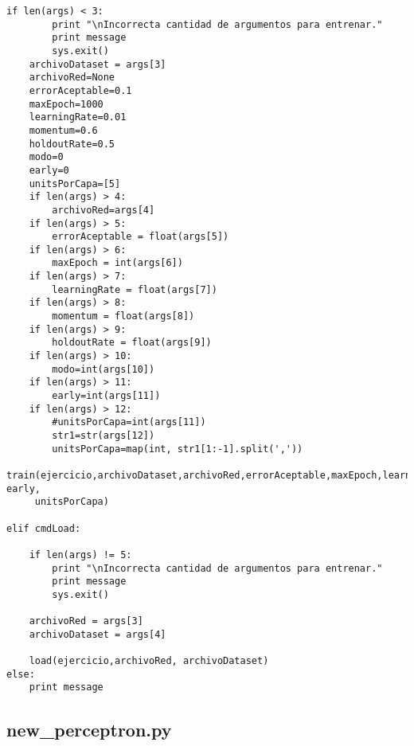 \begin{lstlisting}[caption=main.py]
	if len(args) < 3:
		print "\nIncorrecta cantidad de argumentos para entrenar."
		print message
		sys.exit()
	archivoDataset = args[3]
	archivoRed=None
	errorAceptable=0.1
	maxEpoch=1000
	learningRate=0.01
	momentum=0.6
	holdoutRate=0.5
	modo=0
	early=0
	unitsPorCapa=[5]
	if len(args) > 4:
		archivoRed=args[4]
	if len(args) > 5:
		errorAceptable = float(args[5])
	if len(args) > 6:
		maxEpoch = int(args[6])
	if len(args) > 7:
		learningRate = float(args[7])
	if len(args) > 8:
		momentum = float(args[8])
	if len(args) > 9:
		holdoutRate = float(args[9])
	if len(args) > 10:
		modo=int(args[10])
	if len(args) > 11:
		early=int(args[11])
	if len(args) > 12:
		#unitsPorCapa=int(args[11])
		str1=str(args[12])
		unitsPorCapa=map(int, str1[1:-1].split(','))
	train(ejercicio,archivoDataset,archivoRed,errorAceptable,maxEpoch,learningRate,momentum,holdoutRate,modo, early,
	 unitsPorCapa)

elif cmdLoad:
	
	if len(args) != 5:
		print "\nIncorrecta cantidad de argumentos para entrenar."
		print message
		sys.exit()
		
	archivoRed = args[3]
	archivoDataset = args[4]
	
	load(ejercicio,archivoRed, archivoDataset)
else:
	print message
\end{lstlisting}


\subsection{new\_perceptron.py}

